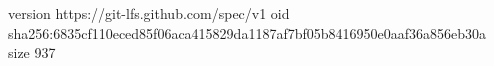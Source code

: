 version https://git-lfs.github.com/spec/v1
oid sha256:6835cf110eced85f06aca415829da1187af7bf05b8416950e0aaf36a856eb30a
size 937

